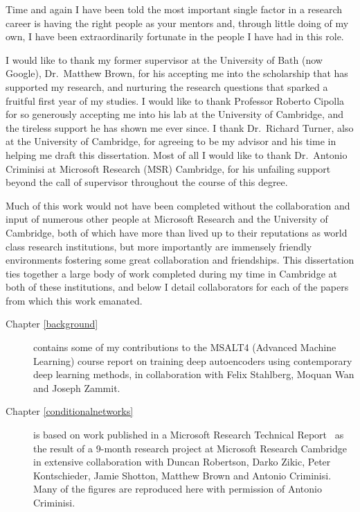 
\begin{acknowledgements}      

Time and again I have been told the most important single factor in a research career is having the right people as your mentors and, through little doing of my own, I have been extraordinarily fortunate in the people I have had in this role. 

I would like to thank my former supervisor at the University of Bath (now Google), Dr.~Matthew Brown, for his accepting me into the scholarship that has supported my research, and nurturing the research questions that sparked a fruitful first year of my studies. I would like to thank Professor Roberto Cipolla for so generously accepting me into his lab at the University of Cambridge, and the tireless support he has shown me ever since. I thank Dr.~Richard Turner, also at the University of Cambridge, for agreeing to be my advisor and his time in helping me draft this dissertation. Most of all I would like to thank Dr.~Antonio Criminisi at Microsoft Research (MSR) Cambridge, for his unfailing support beyond the call of supervisor throughout the course of this degree.

Much of this work would not have been completed without the collaboration and input of numerous other people at Microsoft Research and the University of Cambridge, both of which have more than lived up to their reputations as world class research institutions, but more importantly are immensely friendly environments fostering some great collaboration and friendships. This dissertation ties together a large body of work completed during my time in Cambridge at both of these institutions, and below I detail collaborators for each of the papers from which this work emanated.

\begin{description}
	\item[Chapter \ref{background}] contains some of my contributions to the MSALT4 (Advanced Machine Learning) course report on training deep autoencoders using contemporary deep learning methods, in collaboration with Felix Stahlberg, Moquan Wan and Joseph Zammit.

	\item[Chapter \ref{conditionalnetworks}] is based on work published in a Microsoft Research Technical Report~\citep{Ioannou2015} as the result of a 9-month research project at Microsoft Research Cambridge in extensive collaboration with Duncan Robertson, Darko Zikic, Peter Kontschieder, Jamie Shotton, Matthew Brown and Antonio Criminisi. Many of the figures are reproduced here with permission of Antonio Criminisi.


\end{description}
\end{acknowledgements}
